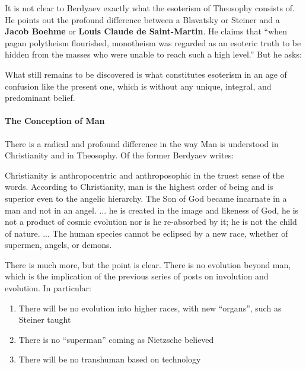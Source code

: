 It is not clear to Berdyaev exactly what the esoterism of Theosophy consists of. He points out the profound difference between a Blavatsky or Steiner and a \textbf{Jacob Boehme} or \textbf{Louis Claude de Saint-Martin}. He claims that ``when pagan polytheism flourished, monotheism was regarded as an esoteric truth to be hidden from the masses who were unable to reach such a high level.'' But he asks:

\begin{quotex}
What still remains to be discovered is what constitutes esoterism in an age of confusion like the present one, which is without any unique, integral, and predominant belief.
\end{quotex}


\paragraph{The Conception of Man}


There is a radical and profound difference in the way Man is understood in Christianity and in Theosophy. Of the former Berdyaev writes:

\begin{quotex}
Christianity is anthropocentric and anthroposophic in the truest sense of the words. According to Christianity, man is the highest order of being and is superior even to the angelic hierarchy. The Son of God became incarnate in a man and not in an angel. ... he is created in the image and likeness of God, he is not a product of cosmic evolution nor is he re-absorbed by it; he is not the child of nature. ... The human species cannot be eclipsed by a new race, whether of supermen, angels, or demons.
\end{quotex}


There is much more, but the point is clear. There is no evolution beyond man, which is the implication of the previous series of posts on involution and evolution. In particular:

\begin{enumerate}


\item There will be no evolution into higher races, with new ``organs'', such as Steiner taught

\item There is no ``superman'' coming as Nietzsche believed

\item There will be no transhuman based on technology
\end{enumerate}


